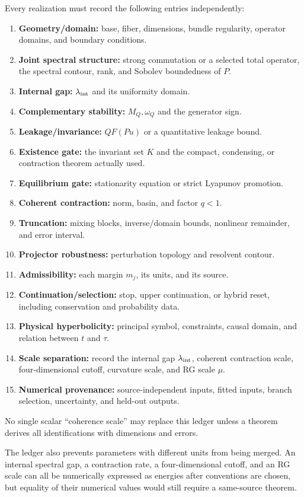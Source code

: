 \documentclass[11pt]{article}
\begin{document}
Every realization must record the following entries independently:
\begin{enumerate}
\item \textbf{Geometry/domain:} base, fiber, dimensions, bundle regularity,
operator domains, and boundary conditions.
\item \textbf{Joint spectral structure:} strong commutation or a selected
total operator, the spectral contour, rank, and Sobolev boundedness of $P$.
\item \textbf{Internal gap:} $\lambda_{\rm int}$ and its uniformity domain.
\item \textbf{Complementary stability:} $M_Q,\omega_Q$ and the generator sign.
\item \textbf{Leakage/invariance:} $QF(Pu)$ or a quantitative leakage bound.
\item \textbf{Existence gate:} the invariant set $K$ and the compact,
condensing, or contraction theorem actually used.
\item \textbf{Equilibrium gate:} stationarity equation or strict Lyapunov
promotion.
\item \textbf{Coherent contraction:} norm, basin, and factor $q<1$.
\item \textbf{Truncation:} mixing blocks, inverse/domain bounds, nonlinear
remainder, and error interval.
\item \textbf{Projector robustness:} perturbation topology and resolvent
contour.
\item \textbf{Admissibility:} each margin $m_j$, its units, and its source.
\item \textbf{Continuation/selection:} stop, upper continuation, or hybrid
reset, including conservation and probability data.
\item \textbf{Physical hyperbolicity:} principal symbol, constraints, causal
domain, and relation between $t$ and $\tau$.
\item \textbf{Scale separation:} record the internal gap
$\lambda_{\rm int}$, coherent contraction scale, four-dimensional cutoff,
curvature scale, and RG scale $\mu$.
\item \textbf{Numerical provenance:} source-independent inputs, fitted inputs,
branch selection, uncertainty, and held-out outputs.
\end{enumerate}

No single scalar ``coherence scale'' may replace this ledger unless a theorem
derives all identifications with dimensions and errors.

The ledger also prevents parameters with different units from being merged.
An internal spectral gap, a contraction rate, a four-dimensional cutoff, and
an RG scale can all be numerically expressed as energies after conventions are
chosen, but equality of their numerical values would still require a
same-source theorem.
\end{document}
